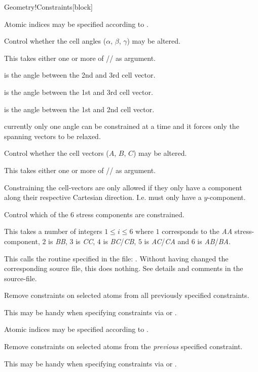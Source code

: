 \begin{fdfentry}{Geometry!Constraints}[block]
\begin{fdfoptions}
    Atomic indices may be specified according to .


    Control whether the cell angles ($\alpha$, $\beta$, $\gamma$) may
    be altered.

    This takes either one or more of
    // as argument.

     is the angle between the 2nd and 3rd cell vector.

     is the angle between the 1st and 3rd cell vector.

     is the angle between the 1st and 2nd cell vector.

    \note currently only one angle can be constrained at a time and it
    forces only the spanning vectors to be relaxed.


    Control whether the cell vectors ($A$, $B$, $C$) may be altered.

    This takes either one or more of // as
    argument.

    Constraining the cell-vectors are only allowed if they only have a
    component along their respective Cartesian
    direction. I.e.  must only have a $y$-component.


    \option[stress]%
    Control which of the 6 stress components are constrained.

    This takes a number of integers $1\le i\le6$ where $1$ corresponds
    to the \emph{AA} stress-component, $2$ is \emph{BB}, $3$ is
    \emph{CC}, $4$ is \emph{BC}/\emph{CB}, $5$ is \emph{AC}/\emph{CA}
    and $6$ is \emph{AB}/\emph{BA}.


    \option[routine]%
    This calls the  routine specified in the file:
    . Without having changed the corresponding source
    file, this does nothing.
    See details and comments in the source-file.


    \option[clear]%
    Remove constraints on selected atoms from all previously specified
    constraints.

    This may be handy when specifying constraints via  or
    .

    Atomic indices may be specified according to .


    Remove constraints on selected atoms from the \emph{previous} specified
    constraint.

    This may be handy when specifying constraints via  or
    .


\end{fdfoptions}
\end{fdfentry}
